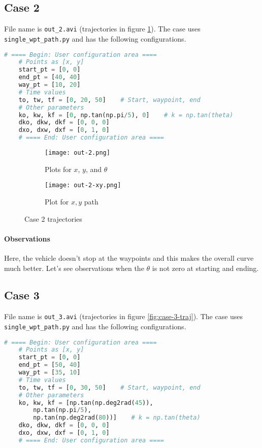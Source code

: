 \subsection{Case 2}

File name is \texttt{out\_2.avi} (trajectories in figure \ref{fig:case-2-traj}). The case uses \texttt{single\_wpt\_path.py} and has the following configurations.

\begin{lstlisting}[language=Python, numbers=none]
    # ==== Begin: User configuration area ====
    # Points as [x, y]
    start_pt = [0, 0]
    end_pt = [40, 40]
    way_pt = [10, 20]
    # Time values
    to, tw, tf = [0, 20, 50]    # Start, waypoint, end
    # Other parameters
    ko, kw, kf = [0, np.tan(np.pi/5), 0]    # k = np.tan(theta)
    dko, dkw, dkf = [0, 0, 0]
    dxo, dxw, dxf = [0, 1, 0]
    # ==== End: User configuration area ====
\end{lstlisting}

\begin{figure}[ht]
    \centering
    \begin{subfigure}[b]{0.3\textwidth}
        \texttt{[image: out-2.png]}
        \caption{Plots for $x$, $y$, and $\theta$}
    \end{subfigure}
    \begin{subfigure}[b]{0.6\textwidth}
        \texttt{[image: out-2-xy.png]}
        \caption{Plot for $x, y$ path}
    \end{subfigure}
    \caption{Case 2 trajectories}
    \label{fig:case-2-traj}
\end{figure}

\paragraph*{Observations}
Here, the vehicle doesn't stop at the waypoints and this makes the overall curve much better. Let's see observations when the $\theta$ is not zero at starting and ending.

\subsection{Case 3}

File name is \texttt{out\_3.avi} (trajectories in figure \ref{fig:case-3-traj}). The case uses \texttt{single\_wpt\_path.py} and has the following configurations.

\begin{lstlisting}[language=Python, numbers=none]
    # ==== Begin: User configuration area ====
    # Points as [x, y]
    start_pt = [0, 0]
    end_pt = [50, 40]
    way_pt = [35, 10]
    # Time values
    to, tw, tf = [0, 30, 50]    # Start, waypoint, end
    # Other parameters
    ko, kw, kf = [np.tan(np.deg2rad(45)), 
        np.tan(np.pi/5), 
        np.tan(np.deg2rad(80))]    # k = np.tan(theta)
    dko, dkw, dkf = [0, 0, 0]
    dxo, dxw, dxf = [0, 1, 0]
    # ==== End: User configuration area ====
\end{lstlisting}

